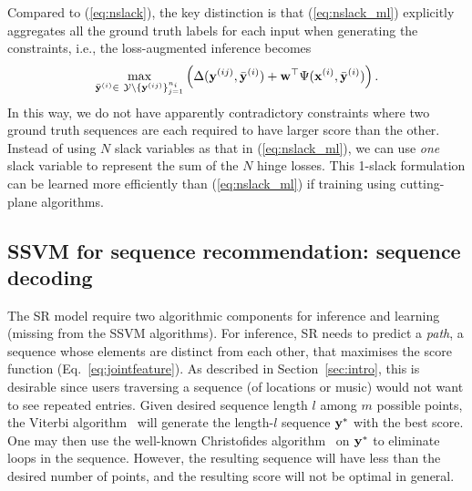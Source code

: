 Compared to (\ref{eq:nslack}), the key distinction is that (\ref{eq:nslack_ml})
explicitly aggregates all the ground truth labels for each input when generating the constraints,
i.e., the loss-augmented inference becomes
\begin{equation}
\label{eq:loss_aug_inf}
\max_{\bar{\mathbf{y}}^{(i)} \in \ \mathcal{Y} \setminus \{\mathbf{y}^{(ij)}\}_{j=1}^{n_i}}
     \left( \Delta(\mathbf{y}^{(ij)}, \bar{\mathbf{y}}^{(i)}) + \mathbf{w}^\top \Psi(\mathbf{x}^{(i)}, \bar{\mathbf{y}}^{(i)}) \right).
\end{equation}
In this way, we do not have apparently contradictory constraints where
two ground truth sequences are each required to have larger score than the other.
Instead of using $N$ slack variables as that in (\ref{eq:nslack_ml}),
we can use \emph{one} slack variable to represent the sum of the $N$ hinge losses. %
This 1-slack formulation can be learned more efficiently than (\ref{eq:nslack_ml})
if training using cutting-plane algorithms. %



\subsection{SSVM for sequence recommendation: sequence decoding}
\label{ssec:subtour}
\label{ssec:SRinf}

The SR model require two algorithmic components for inference and learning
(missing from the SSVM algorithms).
For inference, SR needs to predict a {\em path}, \ie a sequence whose elements are distinct from each other,
that maximises the score function (Eq.~\ref{eq:jointfeature}).
As described in Section~\ref{sec:intro}, this is desirable since users traversing a sequence (of locations or music)
would not want to see repeated entries.
Given desired sequence length $l$ among $m$ possible points, the Viterbi algorithm~\cite{tsochantaridis2005large}
will generate the length-$l$ sequence $\mathbf{y}^*$ with the best score. %
One may then use the well-known
Christofides algorithm~\cite{christofides1976} on $\mathbf{y}^*$ to eliminate loops in the sequence.
However, the resulting sequence will have less than the desired number of points, and the resulting score will not be optimal in general.

